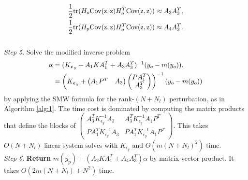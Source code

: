 \documentclass[article,ij4uq]{ij4uq}              %
\begin{document}
\begin{algorithm}[t!]
\begin{align}
    \frac{1}{2}{\rm{tr}}(H_{o}{\rm{Cov(z,z)}}H_{o}^{T}{\rm{Cov(z,z)}})\approx A_{3}A_{3}^{T},\label{eq36}\\
    \frac{1}{2}{\rm{tr}}(H_{p}{\rm{Cov(z,z)}}H_{o}^{T}{\rm{Cov(z,z)}})\approx A_{4}A_{3}^{T}.\label{eq37}
\end{align}\\
\textit{Step 5}. Solve the modified inverse problem
\begin{align}
    \alpha&=(K_{\epsilon_{y}}+A_{1}KA_{1}^{T}+A_{3}A_{3}^{T})^{-1}(y_{o}-m(y_{o})).\notag\\
    &=\left(K_{\epsilon_{y}}+\begin{pmatrix}A_{1}P^{T}&A_{3}\end{pmatrix}\begin{pmatrix}PA_{1}^{T}\\A_{3}^{T}\end{pmatrix}\right)^{-1}(y_{o}-m(y_{o}))\label{eq38}
\end{align}
by applying the SMW formula for the rank-$(N+N_{l})$ perturbation,  as in Algorithm \ref{alg:1}. The time cost is dominated by computing the matrix products that define the blocks of $\begin{pmatrix}A_{3}^{T}K_{\epsilon_{y}}^{-1}A_{3}&A_{3}^{T}K_{\epsilon_{y}}^{-1}A_{1}P^{T}\\PA_{1}^{T}K_{\epsilon_{y}}^{-1}A_{3}&PA_{1}^{T}K_{\epsilon_{y}}^{-1}A_{1}P^{T}\end{pmatrix}$. This takes
$O(N+N_{l})$ linear system solves with $K_{\epsilon_{y}}$ and $O(m(N+N_{l})^{2})$ time.\\
\textit{Step 6}. \textbf{Return} $m(y_{p})+(A_{2}KA_{1}^{T}+A_{4}A_{3}^{T})\alpha$ by matrix-vector product. It takes $O(2m(N+N_{l})+N^{2})$ time.
\end{algorithm}
\end{document}
